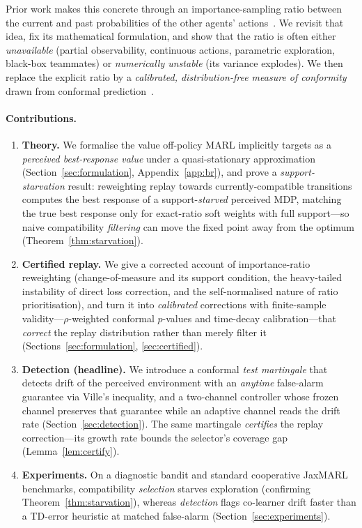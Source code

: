 \documentclass[sigconf]{aamas}
\begin{document}
Prior work makes this concrete through an importance-sampling ratio between the
current and past probabilities of the other agents'
actions~\cite{foerster2017stabilising}. We revisit that idea, fix its
mathematical formulation, and show that the ratio is often either
\emph{unavailable} (partial observability, continuous actions, parametric
exploration, black-box teammates) or \emph{numerically unstable} (its variance
explodes). We then replace the explicit ratio by a \emph{calibrated,
distribution-free measure of conformity} drawn from conformal
prediction~\cite{vovk2005algorithmic,angelopoulos2023gentle}.

\paragraph{Contributions.}
\begin{enumerate}
  \item \textbf{Theory.} We formalise the value off-policy MARL implicitly targets
  as a \emph{perceived best-response value} under a quasi-stationary approximation
  (Section~\ref{sec:formulation}, Appendix~\ref{app:br}), and prove a
  \emph{support-starvation} result: reweighting replay towards currently-compatible
  transitions computes the best response of a support-\emph{starved} perceived MDP,
  matching the true best response only for exact-ratio soft weights with full
  support---so naive compatibility \emph{filtering} can move the fixed point away
  from the optimum (Theorem~\ref{thm:starvation}).
  \item \textbf{Certified replay.} We give a corrected account of importance-ratio
  reweighting (change-of-measure and its support condition, the heavy-tailed
  instability of direct loss correction, and the self-normalised nature of ratio
  prioritisation), and turn it into \emph{calibrated} corrections with
  finite-sample validity---$\rho$-weighted conformal $p$-values and time-decay
  calibration---that \emph{correct} the replay distribution rather than merely
  filter it (Sections~\ref{sec:formulation}, \ref{sec:certified}).
  \item \textbf{Detection (headline).} We introduce a conformal \emph{test
  martingale} that detects drift of the perceived environment with an \emph{anytime}
  false-alarm guarantee via Ville's inequality, and a two-channel controller whose
  frozen channel preserves that guarantee while an adaptive channel reads the drift
  rate (Section~\ref{sec:detection}). The same martingale \emph{certifies} the
  replay correction---its growth rate bounds the selector's coverage gap
  (Lemma~\ref{lem:certify}).
  \item \textbf{Experiments.} On a diagnostic bandit and standard cooperative
  JaxMARL benchmarks, compatibility \emph{selection} starves exploration (confirming
  Theorem~\ref{thm:starvation}), whereas \emph{detection} flags co-learner drift
  faster than a TD-error heuristic at matched false-alarm
  (Section~\ref{sec:experiments}).
\end{enumerate}
\end{document}
